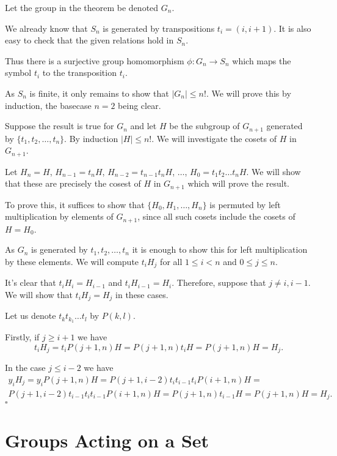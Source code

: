 \documentclass[10pt]{article}
\newenvironment{proof}[1][Proof]{\begin{trivlist}
\item[\hskip \labelsep {\itshape #1}]}{\end{trivlist}}
\begin{document}
\begin{proof}
Let the group in the theorem be denoted $G_n$.

We already know that $S_n$ is generated by transpositions $t_i = (i, i+1)$. It is also easy to check that the given relations hold in $S_n$.

Thus there is a surjective group homomorphism $\phi : G_n \to S_n$ which maps the symbol $t_i$ to the transposition $t_i$.

As $S_n$ is finite, it only remains to show that $|G_n| \leq n!$. We will prove this by induction, the basecase $n = 2$ being clear.

Suppose the result is true for $G_n$ and let $H$ be the subgroup of $G_{n + 1}$ generated by $\{t_1, t_2, \ldots, t_n\}$. By induction $|H| \leq n!$. We will investigate the cosets of $H$ in $G_{n+1}$.

Let $H_n = H$, $H_{n-1} = t_nH$, $H_{n-2} = t_{n-1}t_nH$, $\ldots$, $H_0 = t_1t_2\ldots t_nH$. We will show that these are precisely the cosest of $H$ in $G_{n+1}$ which will prove the result.

To prove this, it suffices to show that $\{H_0, H_1, \ldots, H_n\}$ is permuted by left multiplication by elements of $G_{n+1}$, since all such cosets include the cosets of $H = H_0$.

As $G_n$ is generated by $t_1, t_2, \ldots, t_n$ it is enough to show this for left multiplication by these elements. We will compute $t_iH_j$ for all $1 \leq i < n$ and $0 \leq j \leq n$.

It's clear that $t_iH_i = H_{i-1}$ and $t_iH_{i-1} = H_i$. Therefore, suppose that $j \neq i, i - 1$. We will show that $t_iH_j = H_j$ in these cases.

Let us denote $t_kt_{k_1}\ldots t_{l}$ by $P(k, l)$.

Firstly, if $j \geq i + 1$ we have
$$t_iH_j = t_iP(j+1, n)H = P(j+1, n)t_iH = P(j+1, n)H = H_j.$$

In the case $j \leq i - 2$ we have
\begin{multline*}
y_iH_j = y_iP(j+1, n)H = P(j+1, i-2)t_it_{i-1}t_iP(i+1, n)H =\\
 P(j+1, i-2)t_{i-1}t_it_{i-1}P(i+1, n)H = P(j+1, n)t_{i-1}H = P(j+1, n)H = H_j.
\end{multline*}
$\square$
\end{proof}

\section{Groups Acting on a Set}
\end{document}

